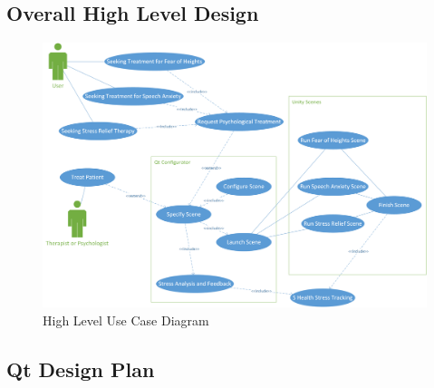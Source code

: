 \documentclass[a4paper,10pt]{article}
\begin{document}
	\subsection{Overall High Level Design}
		\begin{figure}[H]
			\includegraphics[width=\linewidth,height=\paperheight,keepaspectratio]{highUseCase.png}
			\caption{High Level Use Case Diagram}
			\label{fig:highlevelusecase}
		\end{figure}
	\pagebreak
	\subsection{Qt Design Plan}
\end{document}
